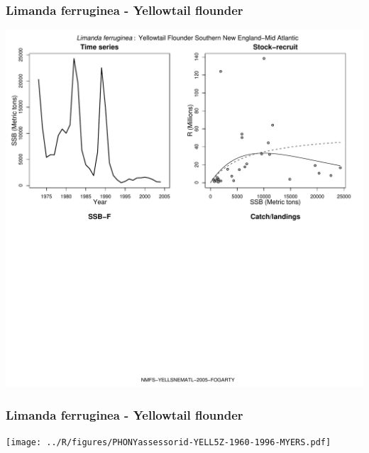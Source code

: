 \subsubsection{Limanda ferruginea - Yellowtail flounder}
\begin{center}
\includegraphics[width=1.2\textwidth]{../R/figures/NMFS-YELLSNEMATL-2005-FOGARTY.pdf}
\end{center}

\subsubsection{Limanda ferruginea - Yellowtail flounder}
\begin{center}
\texttt{[image: ../R/figures/PHONYassessorid-YELL5Z-1960-1996-MYERS.pdf]}
\end{center}


